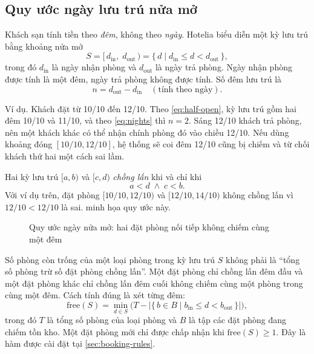 \subsection{Quy ước ngày lưu trú nửa mở}\label{sec:half-open}

Khách sạn tính tiền theo \emph{đêm}, không theo \emph{ngày}. Hotelia biểu diễn một kỳ lưu trú bằng khoảng nửa mở
\begin{equation}
  S = [\,d_{\text{in}},\; d_{\text{out}}\,) = \{\, d \mid d_{\text{in}} \le d < d_{\text{out}} \,\},
  \label{eq:half-open}
\end{equation}
trong đó $d_{\text{in}}$ là ngày nhận phòng và $d_{\text{out}}$ là ngày trả phòng. Ngày nhận phòng được tính là một đêm, ngày trả phòng không được tính. Số đêm lưu trú là
\begin{equation}
  n = d_{\text{out}} - d_{\text{in}} \quad (\text{tính theo ngày}).
  \label{eq:nights}
\end{equation}

Ví dụ. Khách đặt từ 10/10 đến 12/10. Theo \cref{eq:half-open}, kỳ lưu trú gồm hai đêm 10/10 và 11/10, và theo \cref{eq:nights} thì $n = 2$. Sáng 12/10 khách trả phòng, nên một khách khác có thể nhận chính phòng đó vào chiều 12/10. Nếu dùng khoảng đóng $[10/10, 12/10]$, hệ thống sẽ coi đêm 12/10 cũng bị chiếm và từ chối khách thứ hai một cách sai lầm.

Hai kỳ lưu trú $[a, b)$ và $[c, d)$ \emph{chồng lấn} khi và chỉ khi
\begin{equation}
  a < d \;\wedge\; c < b.
  \label{eq:overlap}
\end{equation}
Với ví dụ trên, đặt phòng $[10/10, 12/10)$ và $[12/10, 14/10)$ không chồng lấn vì $12/10 < 12/10$ là sai.  minh họa quy ước này.

\begin{figure}[H]
\centering
{}
\caption{Quy ước ngày nửa mở: hai đặt phòng nối tiếp không chiếm cùng một đêm}\label{fig:half-open}
\end{figure}

Số phòng còn trống của một loại phòng trong kỳ lưu trú $S$ không phải là ``tổng số phòng trừ số đặt phòng chồng lấn''. Một đặt phòng chỉ chồng lấn đêm đầu và một đặt phòng khác chỉ chồng lấn đêm cuối không chiếm cùng một phòng trong cùng một đêm. Cách tính đúng là xét từng đêm:
\begin{equation}
  \text{free}(S) = \min_{d \in S} \Big( T - \big|\{\, b \in B \mid b_{\text{in}} \le d < b_{\text{out}} \,\}\big| \Big),
  \label{eq:free-rooms}
\end{equation}
trong đó $T$ là tổng số phòng của loại phòng và $B$ là tập các đặt phòng đang chiếm tồn kho. Một đặt phòng mới chỉ được chấp nhận khi $\text{free}(S) \ge 1$. Đây là hàm  được cài đặt tại \cref{sec:booking-rules}.

